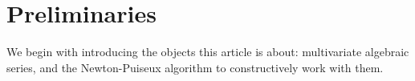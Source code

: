 \documentclass[a4paper,draft]{amsart}
\theoremstyle{definition}
\begin{document}



\section{Preliminaries}\label{sec:prelim}

We begin with introducing the objects this article is about: multivariate algebraic series, and the Newton-Puiseux algorithm to constructively work with them.\\
\end{document}
